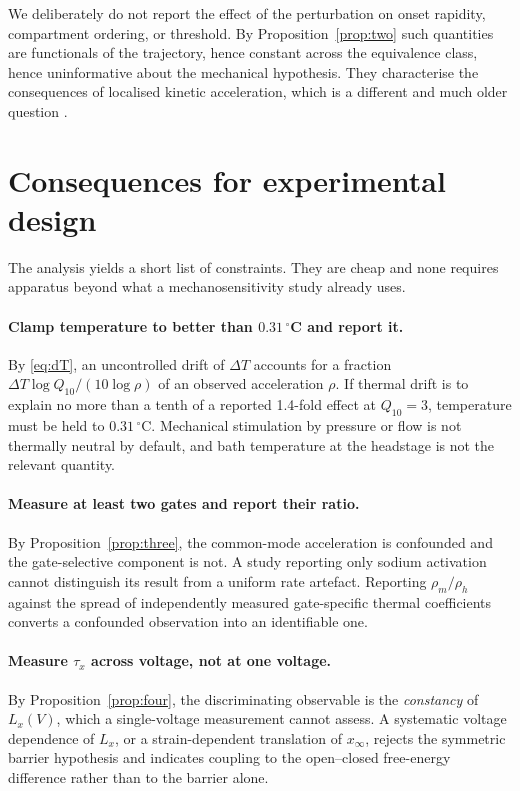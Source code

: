 We deliberately do not report the effect of the perturbation on onset rapidity,
compartment ordering, or threshold. By Proposition~\ref{prop:two} such
quantities are functionals of the trajectory, hence constant across the
equivalence class, hence uninformative about the mechanical hypothesis. They
characterise the consequences of localised kinetic acceleration, which is a
different and much older question \citep{brette2013}.

\section{Consequences for experimental design}
\label{sec:design}

The analysis yields a short list of constraints. They are cheap and none
requires apparatus beyond what a mechanosensitivity study already uses.

\paragraph{Clamp temperature to better than $0.31\,^{\circ}$C and report it.}
By \eqref{eq:dT}, an uncontrolled drift of $\Delta T$ accounts for a fraction
$\Delta T\log Q_{10}/(10\log\rho)$ of an observed acceleration $\rho$. If
thermal drift is to explain no more than a tenth of a reported 1.4-fold effect
at $Q_{10}=3$, temperature must be held to $0.31\,^{\circ}$C. Mechanical
stimulation by pressure or flow is not thermally neutral by default, and bath
temperature at the headstage is not the relevant quantity.

\paragraph{Measure at least two gates and report their ratio.}
By Proposition~\ref{prop:three}, the common-mode acceleration is confounded and
the gate-selective component is not. A study reporting only sodium activation
cannot distinguish its result from a uniform rate artefact. Reporting
$\rho_m/\rho_h$ against the spread of independently measured gate-specific
thermal coefficients converts a confounded observation into an identifiable one.

\paragraph{Measure $\tau_x$ across voltage, not at one voltage.}
By Proposition~\ref{prop:four}, the discriminating observable is the
\emph{constancy} of $L_x(V)$, which a single-voltage measurement cannot assess.
A systematic voltage dependence of $L_x$, or a strain-dependent translation of
$x_\infty$, rejects the symmetric barrier hypothesis and indicates coupling to
the open--closed free-energy difference rather than to the barrier alone.

